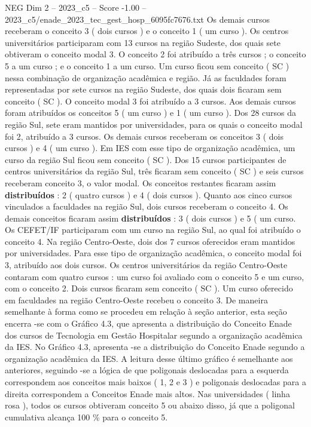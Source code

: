 \begin{textsample}{NEG Dim 2 – 2023\_c5 – Score -1.00 – 2023\_c5/enade\_2023\_tec\_gest\_hosp\_6095fc7676.txt}
Os demais cursos receberam o conceito 3 ( dois cursos ) e o conceito 1 ( um curso ).
Os centros universitários participaram com 13 cursos na região Sudeste, dos quais sete obtiveram o conceito modal 3.
O conceito 2 foi atribuído a três cursos ; o conceito 5 a um curso ; e o conceito 1 a um curso.
Um curso ficou sem conceito ( SC ) nessa combinação de organização acadêmica e região.
Já as faculdades foram representadas por sete cursos na região Sudeste, dos quais dois ficaram sem conceito ( SC ).
O conceito modal 3 foi atribuído a 3 cursos.
Aos demais cursos foram atribuídos os conceitos 5 ( um curso ) e 1 ( um curso ).
Dos 28 cursos da região Sul, sete eram mantidos por universidades, para os quais o conceito modal foi 2, atribuído a 3 cursos.
Os demais cursos receberam os conceitos 3 ( dois cursos ) e 4 ( um curso ).
Em IES com esse tipo de organização acadêmica, um curso da região Sul ficou sem conceito ( SC ).
Dos 15 cursos participantes de centros universitários da região Sul, três ficaram sem conceito ( SC ) e seis cursos receberam conceito 3, o valor modal.
Os conceitos restantes ficaram assim \textbf{distribuídos} : 2 ( quatro cursos ) e 4 ( dois cursos ).
Quanto aos cinco cursos vinculados a faculdades na região Sul, dois cursos receberam o conceito 4.
Os demais conceitos ficaram assim \textbf{distribuídos} : 3 ( dois cursos ) e 5 ( um curso.
Os CEFET/IF participaram com um curso na região Sul, ao qual foi atribuído o conceito 4.
Na região Centro-Oeste, dois dos 7 cursos oferecidos eram mantidos por universidades.
Para esse tipo de organização acadêmica, o conceito modal foi 3, atribuído aos dois cursos.
Os centros universitários da região Centro-Oeste contaram com quatro cursos : um curso foi avaliado com o conceito 5 e um curso, com o conceito 2.
Dois cursos ficaram sem conceito ( SC ).
Um curso oferecido em faculdades na região Centro-Oeste recebeu o conceito 3.
De maneira semelhante à forma como se procedeu em relação à seção anterior, esta seção encerra -se com o Gráfico 4.3, que apresenta a distribuição do Conceito Enade dos cursos de Tecnologia em Gestão Hospitalar segundo a organização acadêmica da IES.
No Gráfico 4.3, apresenta -se a distribuição do Conceito Enade segundo a organização acadêmica da IES.
A leitura desse último gráfico é semelhante aos anteriores, seguindo -se a lógica de que poligonais deslocadas para a esquerda correspondem aos conceitos mais baixos ( 1, 2 e 3 ) e poligonais deslocadas para a direita correspondem a Conceitos Enade mais altos.
Nas universidades ( linha rosa ), todos os cursos obtiveram conceito 5 ou abaixo disso, já que a poligonal cumulativa alcança 100 \% para o conceito 5.

\end{textsample}
